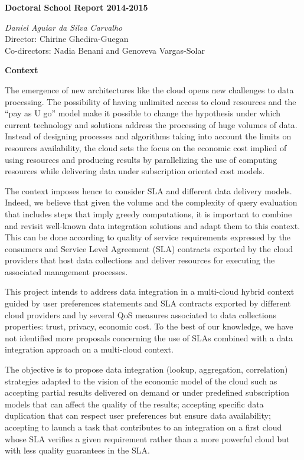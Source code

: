 \documentclass[12pt,a4paper,oneside]{report}
\author{Daniel Aguiar da Silva Carvalho}
\begin{document}
\begin{center}
\textbf{\large{Doctoral School Report 2014-2015}}
\end{center}

\begin{flushright}
\textit{Daniel Aguiar da Silva Carvalho} \\ Director: Chirine Ghedira-Guegan \\ Co-directors: Nadia Benani and Genoveva Vargas-Solar
\end{flushright}

\begin{flushleft}
\textbf{Context}\\
\end{flushleft}
The emergence of new architectures like the cloud opens new challenges to data processing. The possibility of having unlimited access to cloud resources and the “pay as U go” model make it possible to change the hypothesis under which current technology and solutions address the processing of huge volumes of data. Instead of designing processes and algorithms taking into account the limits on resources availability, the cloud sets the focus on the economic cost implied of using resources and producing results by parallelizing the use of computing resources while delivering data under subscription oriented cost models. 

The context imposes hence to consider SLA and different data delivery models. Indeed, we believe that given the volume and the complexity of query evaluation that includes steps that imply greedy computations, it is important to combine and revisit well-known data integration solutions and adapt them to this context. This can be done according to quality of service requirements expressed by the consumers and Service Level Agreement (SLA) contracts exported by the cloud providers that host data collections and deliver resources for executing the associated management processes.

This project intends to address data integration in a multi-cloud hybrid context guided by user preferences statements and SLA contracts exported by different cloud providers and by several QoS measures associated to data collections properties: trust, privacy, economic cost. To the best of our knowledge, we have not identified more proposals concerning the use of SLAs combined with a data integration approach on a multi-cloud context.

The objective is to propose data integration (lookup, aggregation, correlation) strategies adapted to the vision of the economic model of the cloud such as accepting partial results delivered on demand or under predefined subscription models that can affect the quality of the results; accepting specific data duplication that can respect user preferences but ensure data availability; accepting to launch a task that contributes to an integration on a first cloud whose SLA verifies a given requirement rather than a more powerful cloud but with less quality guarantees in the SLA.
\end{document}
